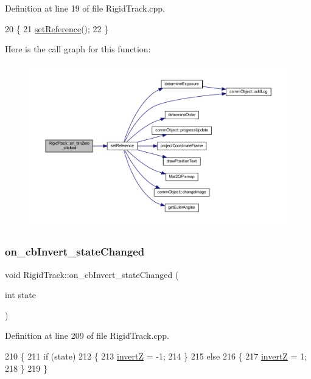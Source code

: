 Definition at line 19 of file Rigid\+Track.\+cpp.


\begin{DoxyCode}
20 \{
21     \hyperlink{main_8cpp_a1e6662e0f16887fe97c7bebe05065972}{setReference}();
22 \}
\end{DoxyCode}
Here is the call graph for this function\+:\nopagebreak
\begin{figure}[H]
\begin{center}
\leavevmode
\includegraphics[width=350pt]{class_rigid_track_afb1a4edcacc818db4ec6bb017dd07e0f_cgraph}
\end{center}
\end{figure}
\mbox{\label{class_rigid_track_ab347b3edeca55685f4d601549596d44a}} 
\subsubsection{\texorpdfstring{on\+\_\+cb\+Invert\+\_\+state\+Changed}{on\_cbInvert\_stateChanged}}
{\footnotesize\ttfamily void Rigid\+Track\+::on\+\_\+cb\+Invert\+\_\+state\+Changed (\begin{DoxyParamCaption}\item[{int}]{state }\end{DoxyParamCaption})\hspace{0.3cm}{\ttfamily [slot]}}



Definition at line 209 of file Rigid\+Track.\+cpp.


\begin{DoxyCode}
210 \{
211     \textcolor{keywordflow}{if} (state)
212     \{
213         \hyperlink{main_8cpp_a5cc3bd09f5801804b7ae65846e0b9824}{invertZ} = -1;
214     \}
215     \textcolor{keywordflow}{else}
216     \{
217         \hyperlink{main_8cpp_a5cc3bd09f5801804b7ae65846e0b9824}{invertZ} = 1;
218     \}
219 \}
\end{DoxyCode}
\mbox{\label{class_rigid_track_ad6ba1cfe25f18ff0d9f5993aafa36d16}} 
